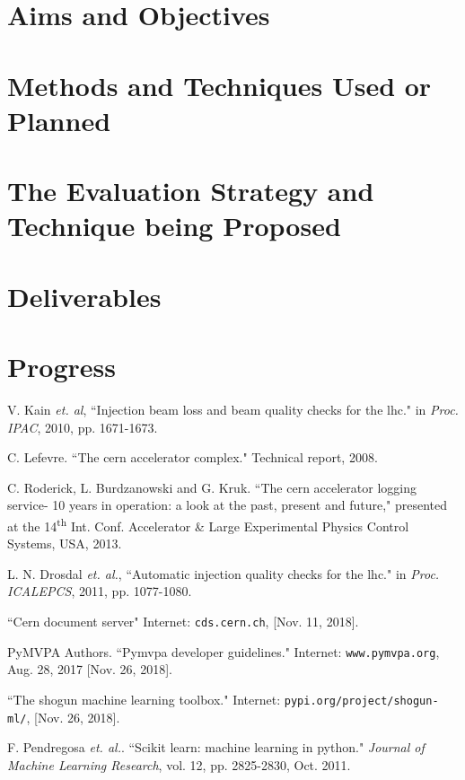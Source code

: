 \documentclass[12pt, twoside]{report}
\begin{document}
	
	\section{Aims and Objectives}
	
	\section{Methods and Techniques Used or Planned}
	
	\section{The Evaluation Strategy and Technique being Proposed}
	
	\section{Deliverables}
	
	\section{Progress}
	
	\begin{thebibliography}{8}
		V. Kain \textit{et. al}, ``Injection beam loss and beam quality checks for the lhc." in \textit{Proc. IPAC}, 2010, pp. 1671-1673.
		
		C. Lefevre. ``The cern accelerator complex." Technical report, 2008.
		
		C. Roderick, L. Burdzanowski and G. Kruk. ``The cern accelerator logging service- 10 years in operation: a look at the past, present and future," presented at the 14\textsuperscript{th} Int. Conf. Accelerator \& Large Experimental Physics Control Systems, USA, 2013.
		
		L. N. Drosdal \textit{et. al.}, ``Automatic injection quality checks for the lhc." in \textit{Proc. ICALEPCS}, 2011, pp. 1077-1080.
		
		``Cern document server" Internet: \texttt{cds.cern.ch}, [Nov. 11, 2018].
		
		PyMVPA Authors. ``Pymvpa developer guidelines." Internet: \texttt{www.pymvpa.org}, Aug. 28, 2017 [Nov. 26, 2018].
		
		``The shogun machine learning toolbox." Internet: \texttt{pypi.org/project/shogun-ml/}, [Nov. 26, 2018].
		
		F. Pendregosa \textit{et. al.}. ``Scikit learn: machine learning in python." \textit{Journal of Machine Learning Research}, vol. 12, pp. 2825-2830, Oct. 2011.
	\end{thebibliography}
\end{document}
